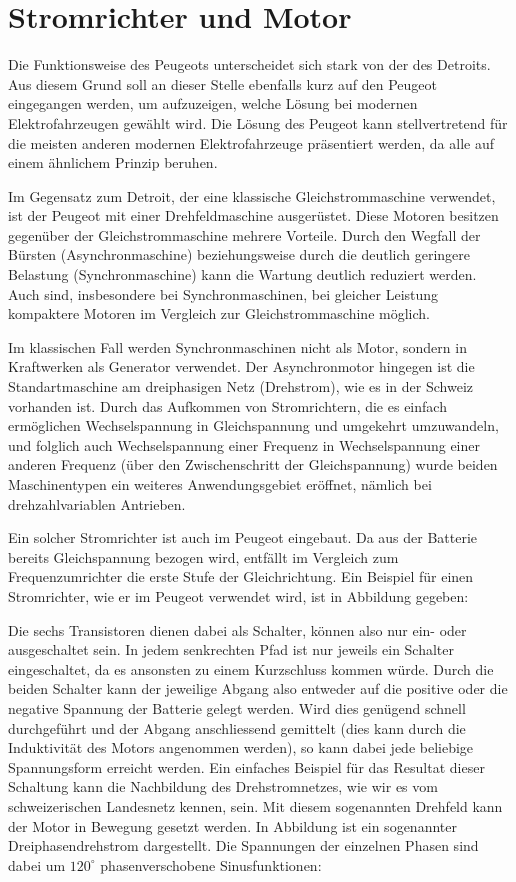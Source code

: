 \section{Stromrichter und Motor}
Die Funktionsweise des Peugeots unterscheidet sich stark von der des Detroits. Aus diesem Grund soll an dieser Stelle ebenfalls kurz auf den Peugeot eingegangen werden, um aufzuzeigen, welche Lösung bei modernen Elektrofahrzeugen gewählt wird. Die Lösung des Peugeot kann stellvertretend für die meisten anderen modernen Elektrofahrzeuge präsentiert werden, da alle auf einem ähnlichem Prinzip beruhen.

Im Gegensatz zum Detroit, der eine klassische Gleichstrommaschine verwendet, ist der Peugeot mit einer Drehfeldmaschine ausgerüstet. Diese Motoren besitzen gegenüber der Gleichstrommaschine mehrere Vorteile. Durch den Wegfall der Bürsten (Asynchronmaschine) beziehungsweise durch die deutlich geringere Belastung (Synchronmaschine) kann die Wartung deutlich reduziert werden. Auch sind, insbesondere bei Synchronmaschinen, bei gleicher Leistung kompaktere Motoren im Vergleich zur Gleichstrommaschine möglich.

Im klassischen Fall werden Synchronmaschinen nicht als Motor, sondern in Kraftwerken als Generator verwendet. Der Asynchronmotor hingegen ist die Standartmaschine am dreiphasigen Netz (Drehstrom), wie es in der Schweiz vorhanden ist. Durch das Aufkommen von Stromrichtern, die es einfach ermöglichen Wechselspannung in Gleichspannung und umgekehrt umzuwandeln, und folglich auch Wechselspannung einer Frequenz in Wechselspannung einer anderen Frequenz (über den Zwischenschritt der Gleichspannung) wurde beiden Maschinentypen ein weiteres Anwendungsgebiet eröffnet, nämlich bei drehzahlvariablen Antrieben.

Ein solcher Stromrichter ist auch im Peugeot eingebaut. Da aus der Batterie bereits Gleichspannung bezogen wird, entfällt im Vergleich zum Frequenzumrichter die erste Stufe der Gleichrichtung. Ein Beispiel für einen Stromrichter, wie er im Peugeot verwendet wird, ist in Abbildung  gegeben:

Die sechs Transistoren dienen dabei als Schalter, können also nur ein- oder ausgeschaltet sein. In jedem senkrechten Pfad ist nur jeweils ein Schalter eingeschaltet, da es ansonsten zu einem Kurzschluss kommen würde. Durch die beiden Schalter kann der jeweilige Abgang also entweder auf die positive oder die negative Spannung der Batterie gelegt werden. Wird dies genügend schnell durchgeführt und der Abgang anschliessend gemittelt (dies kann durch die Induktivität des Motors angenommen werden), so kann dabei jede beliebige Spannungsform erreicht werden. Ein einfaches Beispiel für das Resultat dieser Schaltung kann die Nachbildung des Drehstromnetzes, wie wir es vom schweizerischen Landesnetz kennen, sein. Mit diesem sogenannten Drehfeld kann der Motor in Bewegung gesetzt werden. In Abbildung  ist ein sogenannter Dreiphasendrehstrom dargestellt. Die Spannungen der einzelnen Phasen sind dabei um $120^\circ$ phasenverschobene Sinusfunktionen:

